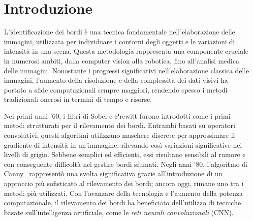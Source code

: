 \section{Introduzione}

L'identificazione dei bordi è una tecnica fondamentale nell'elaborazione delle
immagini, utilizzata per individuare i contorni degli oggetti e le variazioni di
intensità in una scena. Questa metodologia rappresenta una componente cruciale
in numerosi ambiti, dalla computer vision alla robotica, fino all'analisi medica
delle immagini. Nonostante i progressi significativi nell'elaborazione classica
delle immagini, l'aumento della risoluzione e della complessità dei dati visivi
ha portato a sfide computazionali sempre maggiori, rendendo spesso i metodi
tradizionali onerosi in termini di tempo e risorse.

Nei primi anni '60, i filtri di Sobel \cite{SobelFeldman1968IsotropicGradient} e Prewitt furono introdotti come i primi metodi strutturati per il rilevamento dei bordi. Entrambi basati su operatori convolutivi, questi algoritmi utilizzano maschere discrete per approssimare il gradiente di intensità in un'immagine, rilevando così variazioni significative nei livelli di grigio. Sebbene semplici ed efficienti, essi risultano sensibili al rumore e con conseguente difficoltà nel gestire bordi sfumati. Negli anni '80, l'algoritmo di Canny~\cite{CannyPaper} rappresentò una svolta significativa grazie all'introduzione di un approccio più sofisticato al rilevamento dei bordi; ancora oggi, rimane uno tra i metodi più utilizzati. Con l'avanzare della tecnologia e l'aumento della potenza computazionale, il rilevamento dei bordi ha beneficiato dell'utilizzo di tecniche basate sull'intelligenza artificiale, come le \emph{reti neurali convoluzionali} (CNN).
